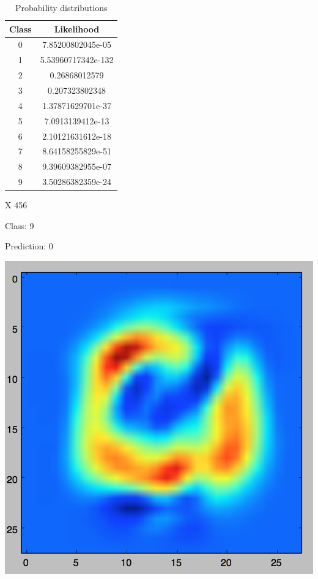 \documentclass[11pt]{article}
\begin{document}
\begin{table}[!th]
\centering
\begin{tabular}{|c|c|}
\hline
Class & Likelihood \\
\hline
0 & 7.85200802045e-05 \\
1 & 5.53960717342e-132 \\
2 & 0.26868012579 \\
3 & 0.207323802348 \\
4 & 1.37871629701e-37 \\
5 & 7.0913139412e-13 \\
6 & 2.10121631612e-18 \\
7 & 8.64158255829e-51 \\
8 & 9.39609382955e-07 \\
9 & 3.50286382359e-24 \\
\hline
\end{tabular}
\caption{Probability distributions}
\label{ex:table}
\end{table}

X 456

Class: 9

Prediction: 0

\includegraphics[scale=.3]{images/bayes_9_0.png}
\end{document}
